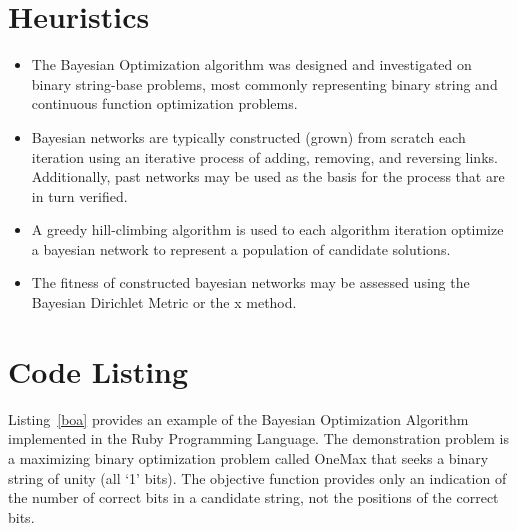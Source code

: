 \documentclass[a4paper, 11pt]{article}
\begin{document}
\section{Heuristics}
\label{sec:heuristics}
\begin{itemize}
	\item The Bayesian Optimization algorithm was designed and investigated on binary string-base problems, most commonly representing binary string and continuous function optimization problems.
	\item Bayesian networks are typically constructed (grown) from scratch each iteration using an iterative process of adding, removing, and reversing links. Additionally, past networks may be used as the basis for the process that are in turn verified.
	\item A greedy hill-climbing algorithm is used to each algorithm iteration optimize a bayesian network to represent a population of candidate solutions.
	\item The fitness of constructed bayesian networks may be assessed using the Bayesian Dirichlet Metric or the x method.
	
\end{itemize}

\section{Code Listing}
\label{sec:code}
Listing~\ref{boa} provides an example of the Bayesian Optimization Algorithm implemented in the Ruby Programming Language. 
The demonstration problem is a maximizing binary optimization problem called OneMax that seeks a binary string of unity (all `1' bits). The objective function provides only an indication of the number of correct bits in a candidate string, not the positions of the correct bits.
\end{document}
